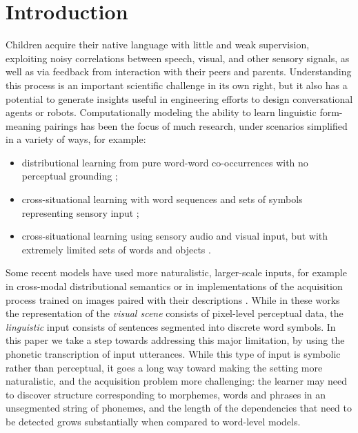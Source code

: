 \section{Introduction}
\label{sec:intro}

Children acquire their native language with little and weak
supervision, exploiting noisy correlations between speech, visual, and
other sensory signals, as well as via feedback from interaction with
their peers and parents. Understanding this process is an important
scientific challenge in its own right, but it also has a potential to
generate insights useful in engineering efforts to design
conversational agents or robots. Computationally modeling the ability
to learn linguistic form-meaning pairings has been the focus of much
research, under scenarios simplified in a variety of ways, for
example:

\begin{itemize}
\item distributional learning from pure word-word co-occurrences with
  no perceptual grounding \cite{landauer1998introduction,kiros2015skip};
\item cross-situational learning with word sequences and sets of
  symbols representing sensory input
  \cite{siskind.96,fazly.etal.10csj};
\item cross-situational learning using sensory audio and visual
  input, but with extremely limited sets of words and objects
  \cite{Roy2002113,iwahashi2003language}.
\end{itemize}

Some recent models have used more naturalistic, larger-scale inputs,
for example in cross-modal distributional semantics
\cite{lazaridou2015combining} or in implementations of the acquisition
process trained on images paired with their descriptions
\cite{chrupala2015learning}. While in these works the representation
of the {\it visual scene} consists of pixel-level perceptual data, the
{\it linguistic} input consists of sentences segmented into discrete
word symbols. In this paper we take a step towards addressing this
major limitation, by using the phonetic transcription of input
utterances. While this type of input is symbolic rather than
perceptual, it goes a long way toward making the setting more
naturalistic, and the acquisition problem more challenging: the
learner may need to discover structure corresponding to morphemes, words
and phrases in an unsegmented string of phonemes, and the length of
the dependencies that need to be detected grows substantially when
compared to word-level models.

